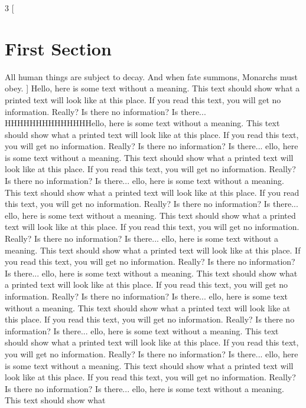 \documentclass{article}
\begin{document}
 \begin{multicols}{3}
 [
 \section{First Section}
 All human things are subject to decay. And when fate summons, Monarchs must obey.
 ]
 Hello, here is some text without a meaning.  This text should show what 
 a printed text will look like at this place.
 If you read this text, you will get no information.  Really?  Is there 
 no information?  Is there...
HHHHHHHHHHHHHHello, here is some text without a meaning.  This text should show what 
 a printed text will look like at this place.
 If you read this text, you will get no information.  Really?  Is there 
 no information?  Is there...
ello, here is some text without a meaning.  This text should show what 
 a printed text will look like at this place.
 If you read this text, you will get no information.  Really?  Is there 
 no information?  Is there...
ello, here is some text without a meaning.  This text should show what 
 a printed text will look like at this place.
 If you read this text, you will get no information.  Really?  Is there 
 no information?  Is there...
ello, here is some text without a meaning.  This text should show what 
 a printed text will look like at this place.
 If you read this text, you will get no information.  Really?  Is there 
 no information?  Is there...
ello, here is some text without a meaning.  This text should show what 
 a printed text will look like at this place.
 If you read this text, you will get no information.  Really?  Is there 
 no information?  Is there...
ello, here is some text without a meaning.  This text should show what 
 a printed text will look like at this place.
 If you read this text, you will get no information.  Really?  Is there 
 no information?  Is there...
ello, here is some text without a meaning.  This text should show what 
 a printed text will look like at this place.
 If you read this text, you will get no information.  Really?  Is there 
 no information?  Is there...
ello, here is some text without a meaning.  This text should show what 
 a printed text will look like at this place.
 If you read this text, you will get no information.  Really?  Is there 
 no information?  Is there...
ello, here is some text without a meaning.  This text should show what 
 a printed text will look like at this place.
 If you read this text, you will get no information.  Really?  Is there 
 no information?  Is there...
ello, here is some text without a meaning.  This text should show what 

\end{multicols}
\end{document}
